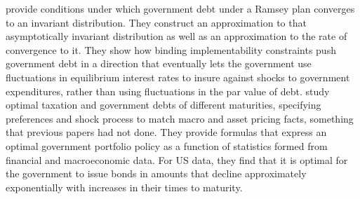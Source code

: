 \documentclass[12pt]{article}
\begin{document}
\citet{bhandari2017fiscal} provide conditions under which government debt under a Ramsey plan converges to an invariant distribution. They
 construct an approximation to that asymptotically invariant distribution as well as  an approximation to the  rate of convergence to it.
They show how binding implementability constraints push government debt in a direction that eventually  lets the government use fluctuations in equilibrium interest rates to insure against shocks to government expenditures,  rather   than using fluctuations in the par value of debt.
\citet{aparisiLannoy2024}
study  optimal taxation and government debts of  different  maturities, specifying  preferences and shock process to match macro and asset pricing facts, something that previous papers had not done. They provide formulas that express an optimal government  portfolio policy  as a function of statistics formed from financial and macroeconomic data. For US data, they find that  it is optimal for the government to  issue bonds in amounts that decline approximately exponentially with increases in their times to maturity.





%
\end{document}
